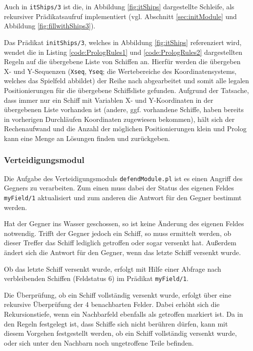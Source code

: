 	Auch in \texttt{itShips/3} ist die, in Abbildung \ref{fig:itShips} dargestellte Schleife, als rekursiver Prädikatsaufruf implementiert 
	(vgl. Abschnitt \ref{sec:initModule} und Abbildung \ref{fig:fillwithShips3}).
	
	Das Prädikat \texttt{initShips/3}, welches in Abbildung \ref{fig:itShips} referenziert wird, wendet die in Listing \ref{code:PrologRules1} 
	und \ref{code:PrologRules2} dargestellten 
	Regeln auf die übergebene Liste von Schiffen an. Hierfür werden die übergeben X- und Y-Sequenzen (\texttt{Xseq}, \texttt{Yseq}; die Wertebereiche des Koordinatensystems, 
	welches das Spielfeld abbildet) der Reihe nach abgearbeitet und somit alle legalen Positionierungen für die übergebene Schiffsliste gefunden. Aufgrund der 
	Tatsache, dass immer nur ein Schiff mit Variablen X- und Y-Koordinaten in der übergebenen Liste vorhanden ist (andere, ggf. vorhandene Schiffe, haben bereits 
	in vorherigen Durchläufen Koordinaten zugewiesen bekommen), hält sich der Rechenaufwand und die Anzahl der möglichen Positionierungen klein und Prolog kann 
	eine Menge an Lösungen finden und zurückgeben.
\subsubsection{Verteidigungsmodul} \label{sec:defendModule}
	Die Aufgabe des Verteidigungsmoduls \texttt{defendModule.pl} ist es einen Angriff des Gegners zu verarbeiten.
	Zum einen muss dabei der Status des eigenen Feldes \texttt{myField/1} aktualisiert 
	und zum anderen die Antwort für den Gegner bestimmt werden.
	
	Hat der Gegner ins Wasser geschossen, so ist keine Änderung des eigenen Feldes notwendig. Trifft der Gegner jedoch ein Schiff,
	so muss ermittelt werden, ob dieser Treffer das Schiff lediglich getroffen oder sogar versenkt hat. Außerdem ändert sich die Antwort
	für den Gegner, wenn das letzte Schiff versenkt wurde.
	
	Ob das letzte Schiff versenkt wurde, erfolgt mit Hilfe einer Abfrage nach verbleibenden Schiffen (Feldstatus 6) im Prädikat \texttt{myField/1}.
	
	Die Überprüfung, ob ein Schiff vollständig versenkt wurde, erfolgt über eine rekursive Überprüfung der 4 benachbarten Felder.
	Dabei erhöht sich die Rekursionstiefe, wenn ein Nachbarfeld ebenfalls als getroffen markiert ist. 
	Da in den Regeln festgelegt ist, dass Schiffe sich nicht berühren dürfen, kann mit diesem Vorgehen festgestellt werden, ob ein Schiff
	vollständig versenkt wurde, oder sich unter den Nachbarn noch ungetroffene Teile befinden.
	
